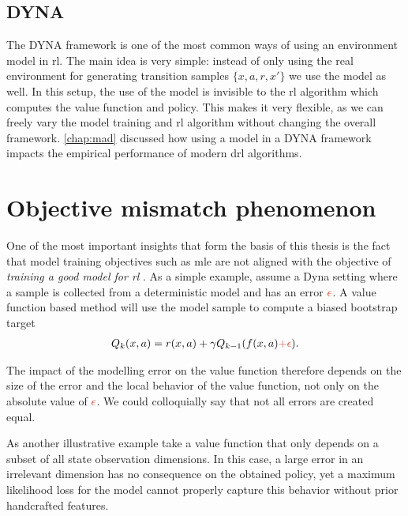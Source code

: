 \subsection{DYNA}

The DYNA framework \parencite{dyna} is one of the most common ways of using an environment model in \ac{rl}.
The main idea is very simple: instead of only using the real environment for generating transition samples $\{x,a,r,x'\}$ we use the model as well.
In this setup, the use of the model is invisible to the \ac{rl} algorithm which computes the value function and policy.
This makes it very flexible, as we can freely vary the model training and \ac{rl} algorithm without changing the overall framework.
\autoref{chap:mad} discussed how using a model in a DYNA framework impacts the empirical performance of modern \ac{drl} algorithms.


\section{Objective mismatch phenomenon}

\label{chap:background:objective}

One of the most important insights that form the basis of this thesis is the fact that model training objectives such as \ac{mle} are not aligned with the objective of \emph{training a good model for \ac{rl}} \parencite{schneider1997exploiting,kearns2002near,joseph2013reinforcement,vaml,talvitie2017self,lambert202objective}.
As a simple example, assume a Dyna setting where a sample is collected from a deterministic model and has an error ${\color{uoftred}\epsilon}$.
A value function based method will use the model sample to compute a biased bootstrap target
\begin{align}
    Q_k(\state,a) = r(\state,a) + \gamma Q_{k-1}(f(\state, a) {\color{uoftred} + \epsilon}).
\end{align}

The impact of the modelling error on the value function therefore depends on the size of the error and the local behavior of the value function, not only on the absolute value of ${\color{uoftred}\epsilon}$. 
We could colloquially say that not all errors are created equal.

As another illustrative example take a value function that only depends on a subset of all state observation dimensions. 
In this case, a large error in an irrelevant dimension has no consequence on the obtained policy, yet a maximum likelihood loss for the model cannot properly capture this behavior without prior handcrafted features.

